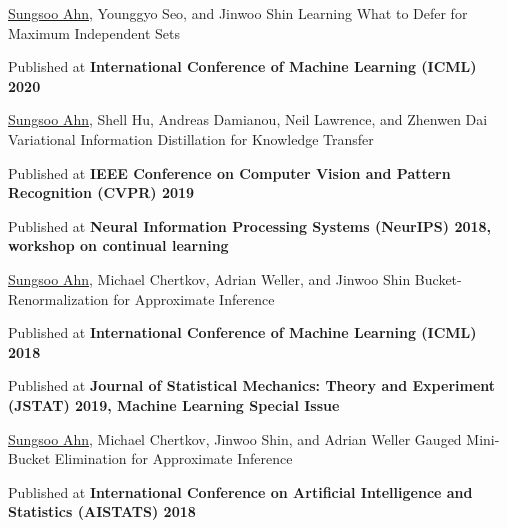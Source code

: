 \begin{cventries}
  \cventrypublication
    {\underline{Sungsoo Ahn}, Younggyo Seo, and Jinwoo Shin}
    {Learning What to Defer for Maximum Independent Sets} 
    {
      \begin{cvitems}
        \item {Published at \textbf{International Conference of Machine Learning (ICML) 2020}}
      \end{cvitems}
    }
    \vspace{.1in}

  \cventrypublication
    {\underline{Sungsoo Ahn}, Shell Hu, Andreas Damianou, Neil Lawrence, and Zhenwen Dai}
    {Variational Information Distillation for Knowledge Transfer}
    {
      \begin{cvitems}
        \item {Published at \textbf{IEEE Conference on Computer Vision and Pattern Recognition (CVPR) 2019}}
        \item {Published at \textbf{Neural Information Processing Systems (NeurIPS) 2018, workshop on continual learning}}
      \end{cvitems}
    }
    \vspace{.1in}

  \cventrypublication
    {\underline{Sungsoo Ahn}, Michael Chertkov, Adrian Weller, and Jinwoo Shin}
    {Bucket-Renormalization for Approximate Inference}
    {
      \begin{cvitems}
        \item {Published at \textbf{International Conference of Machine Learning (ICML) 2018}}
        \item {Published at \textbf{Journal of Statistical Mechanics: Theory and Experiment (JSTAT) 2019, Machine Learning Special Issue}}
      \end{cvitems}
    }
    \vspace{.1in}

  \cventrypublication
    {\underline{Sungsoo Ahn}, Michael Chertkov, Jinwoo Shin, and Adrian Weller}
    {Gauged Mini-Bucket Elimination for Approximate Inference}
    {
      \begin{cvitems}
        \item {Published at \textbf{International Conference on Artificial Intelligence and Statistics (AISTATS) 2018}}
      \end{cvitems}
    }
    \vspace{.1in}


\end{cventries}
